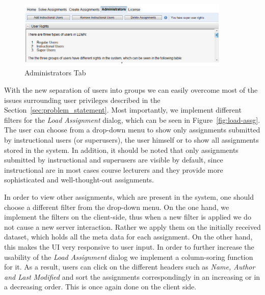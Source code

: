\begin{figure}[h]
	\begin{center}
		\includegraphics[width=0.9\textwidth]{./img/admin-ui.png}
		\caption{Administrators Tab}
		\label{fig:admin-ui}
	\end{center}
\end{figure}

With the new separation of users into groups we can easily overcome most of 
the issues surrounding user privileges described in the Section~\ref{sec:problem_statement}.
Most importantly, we implement different filters for the \emph{Load Assignment} dialog,
which can be seen in Figure~\ref{fig:load-assg}. The user can choose from 
a drop-down menu to show only assignments submitted by instructional users 
(or superusers), the user himself or to show all assignments stored in the system. 
In addition, it should be noted that only assignments submitted
by instructional and superusers are visible by default, since instructional are in most
cases course lecturers and they provide more sophisticated and 
well-thought-out assignments. 

In order to view other assignments, which are present in the system, 
one should choose a different filter from the drop-down menu. 
On the one hand, we implement the filters on the client-side, thus when a new filter is
applied we do not cause a new server interaction. Rather we apply them
on the initially received dataset, which holds all the meta data for each assignment.
On the other hand, this makes the UI very responsive to user input. 
In order to further increase the usability of the \emph{Load Assignment} dialog
we implement a column-soring function for it. As a result, users can click on
the different headers such as \emph{Name, Author and Last Modified} and sort the 
assignments correspondingly in an increasing or in a decreasing order. This is once
again done on the client side. 


